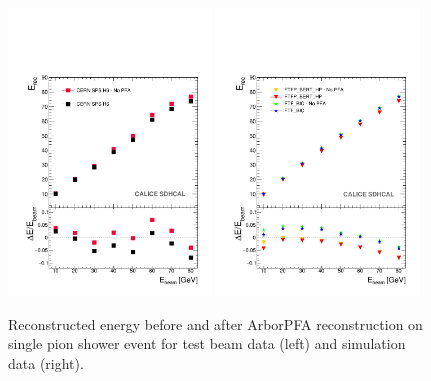 \documentclass[cits]{JINST}
\begin{document}
\begin{figure}[!h]
  \begin{center}
    \includegraphics[width=0.48\textwidth]{plots/SingleParticle/CALICESDHCAL/DATA_ONLY/Single_DATA_ONLY_ERec.pdf}
    \includegraphics[width=0.48\textwidth]{plots/SingleParticle/CALICESDHCAL/MC_ONLY/Single_MC_ONLY_ERec.pdf} \\
  \end{center}
  \caption{\label{ARBOR_SINGLE_PARTICLE_EREC_DATA_MC} Reconstructed energy before and after ArborPFA reconstruction on single pion shower event for test beam data (left) and simulation data (right).}
\end{figure}
\end{document}
